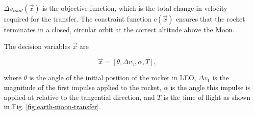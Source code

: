 \documentclass[10pt,twocolumn]{revtex4-2}    %
\begin{document}
$\Delta v_{total}(\vec{x})$ is the objective function, which is the total change in velocity required for the transfer. The constraint function $c(\vec{x})$ ensures that the rocket terminates in a closed, circular orbit at the correct altitude above the Moon.

The decision variables $\vec{x}$ are 

\begin{equation}
    \vec{x} = [\theta, \Delta v_1, \alpha, T],
\end{equation}

where $\theta$ is the angle of the initial position of the rocket in LEO, $\Delta v_1$ is the magnitude of the first impulse applied to the rocket, $\alpha$ is the angle this impulse is applied at relative to the tangential direction, and $T$ is the time of flight as shown in Fig. \ref{fig:earth-moon-transfer}.
\end{document}
